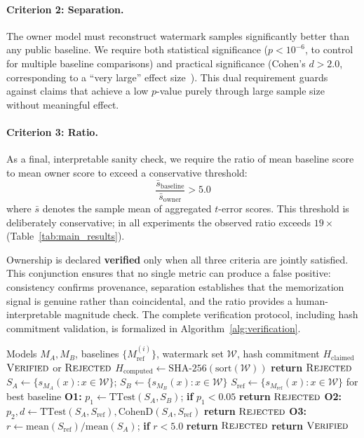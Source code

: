 \documentclass{article}
\begin{document}
\paragraph{Criterion 2: Separation.}
The owner model must reconstruct watermark samples significantly better than any public baseline. We require both statistical significance ($p < 10^{-6}$, to control for multiple baseline comparisons) and practical significance (Cohen's $d > 2.0$, corresponding to a ``very large'' effect size~\citep{cohen1988statistical}). This dual requirement guards against claims that achieve a low $p$-value purely through large sample size without meaningful effect.

\paragraph{Criterion 3: Ratio.}
As a final, interpretable sanity check, we require the ratio of mean baseline score to mean owner score to exceed a conservative threshold:
\begin{equation}
\frac{\bar{s}_{\text{baseline}}}{\bar{s}_{\text{owner}}} > 5.0
\end{equation}
where $\bar{s}$ denotes the sample mean of aggregated $t$-error scores. This threshold is deliberately conservative; in all experiments the observed ratio exceeds $19\times$ (Table~\ref{tab:main_results}).

Ownership is declared \textbf{verified} only when all three criteria are jointly satisfied. This conjunction ensures that no single metric can produce a false positive: consistency confirms provenance, separation establishes that the memorization signal is genuine rather than coincidental, and the ratio provides a human-interpretable magnitude check. The complete verification protocol, including hash commitment validation, is formalized in Algorithm~\ref{alg:verification}.
\begin{algorithm}[t]
\caption{Ownership Verification Protocol}
\label{alg:verification}
\begin{algorithmic}
\REQUIRE Models $M_A, M_B$, baselines $\{M_{\text{ref}}^{(i)}\}$, watermark set $\mathcal{W}$, hash commitment $H_{\text{claimed}}$
\ENSURE $\textsc{Verified}$ or $\textsc{Rejected}$
\STATE $H_{\text{computed}} \leftarrow \text{SHA-256}(\text{sort}(\mathcal{W}))$
    \STATE \textbf{return} $\textsc{Rejected}$
\ENDIF
\STATE $S_A \leftarrow \{s_{M_A}(x) : x \in \mathcal{W}\}$; $S_B \leftarrow \{s_{M_B}(x) : x \in \mathcal{W}\}$
\STATE $S_{\text{ref}} \leftarrow \{s_{M_{\text{ref}}}(x) : x \in \mathcal{W}\}$ for best baseline
\STATE \textbf{O1:} $p_1 \leftarrow \text{TTest}(S_A, S_B)$; \textbf{if} $p_1 < 0.05$ \textbf{return} $\textsc{Rejected}$
\STATE \textbf{O2:} $p_2, d \leftarrow \text{TTest}(S_A, S_{\text{ref}}), \text{CohenD}(S_A, S_{\text{ref}})$
    \STATE \textbf{return} $\textsc{Rejected}$
\ENDIF
\STATE \textbf{O3:} $r \leftarrow \text{mean}(S_{\text{ref}}) / \text{mean}(S_A)$; \textbf{if} $r < 5.0$ \textbf{return} $\textsc{Rejected}$
\STATE \textbf{return} $\textsc{Verified}$
\end{algorithmic}
\end{algorithm}
\end{document}

